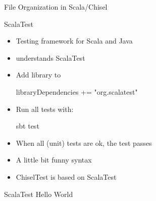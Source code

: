 \begin{frame}[fragile]{File Organization in Scala/Chisel}
\end{frame}



\begin{frame}[fragile]{ScalaTest}
\begin{itemize}
\item Testing framework for Scala and Java
\item {} understands ScalaTest
\item Add library to 
\begin{chisel}
libraryDependencies += "org.scalatest" %
\end{chisel}
\item Run all tests with:
\begin{chisel}
sbt test
\end{chisel}
\item When all (unit) tests are ok, the test passes
\item A little bit funny syntax
\item ChiselTest is based on ScalaTest
\end{itemize}
\end{frame}

\begin{frame}[fragile]{ScalaTest Hello World}
\end{frame}


